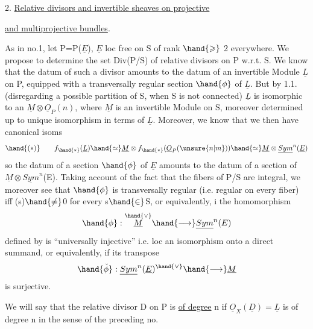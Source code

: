 
2. \uline{Relative divisors and invertible sheaves on projective}

\uline{and multiprojective bundles}.

 As in no.1, let P=P($\underline{E}$), $\underline{E}$ loc free on S of rank $\hand{\geqslant}$ 2 everywhere.
We propose to determine the set Div(P/S) of relative divisors
 on P w.r.t. S. We know that the datum of such a divisor amounts to the
datum of an invertible Module $\underline{L}$ on P, equipped with a transversally regular
section $\hand{\phi}$ of $\underline{L}$. But by 1.1. (disregarding a
possible partition of S, when S is not connected) $\underline{L}$ is isomorphic
to an $\underline{M}\otimes\underline{O}_P(n)$, where $\underline{M}$ is an invertible Module on S, moreover determined
up to unique isomorphism in terms of $\underline{L}$. Moreover, we know
that we then have canonical isoms
\[ \hand{(*)} \qquad f_{\hand{*}}(\underline{L}) \hand{\simeq} \underline{M}\otimes f_{\hand{*}}(\underline{O}_P(\unsure{n|m})) \hand{\simeq} \underline{M}\otimes\underline{Sym}^n(\underline{E}) \]
so the datum of a section  $\hand{\phi}$ of $\underline{E}$ amounts to the datum of a section
 of $\underline{M}\otimes\underline{Sym}^n$(E). Taking account of the fact that the fibers of P/S are integral,
we moreover see that $\hand{\phi}$ is transversally regular (i.e. regular
on every fiber) iff \hand{$\phi$}(s)$\hand{\neq}$0 for every s$\hand{\in}$S, or equivalently,
i the homomorphism
\[ \hand{\phi} : \overset{\hand{\vee}}{\underline{M}} \hand{\longrightarrow} \underline{Sym}^n(E) \]
defined by \hand{$\phi$} is ``universally injective'' i.e. loc an isomorphism onto
a direct summand, or equivalently, if its transpose
\[ \hand{\check{\phi}} : \underline{Sym}^n(\underline{E})^{\hand{\vee}} \hand{\longrightarrow} \underline{M} \]
is surjective.

We will say that the relative divisor D on P is \uline{of degree} n
if $\underline{O}_X(\underline{D})= \underline{L}$ is of degree n in the sense of the preceding no. 

